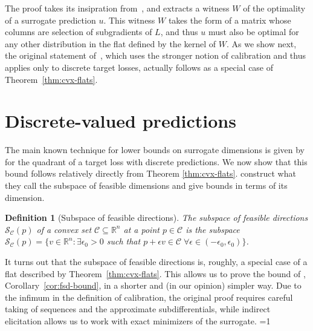 \documentclass{article}
\newcommand{\Comments}{1}
\newcommand{\mynote}[2]{\ifnum\Comments=1\textcolor{#1}{#2}\fi}
\newcommand{\mytodo}[2]{\ifnum\Comments=1%
	\todo[linecolor=#1!80!black,backgroundcolor=#1,bordercolor=#1!80!black]{#2}\fi}
\newcommand{\raft}[1]{\mytodo{green!20!white}{RF: #1}}
\newcommand{\jessiet}[1]{\mytodo{purple!20!white}{JF: #1}}
\newcommand{\bo}[1]{\mynote{blue}{[Bo: #1]}}
\newcommand{\reals}{\mathbb{R}}
\newcommand{\C}{\mathcal{C}}
\newcommand{\Sc}{\mathcal{S}}  %
\newtheorem{definition}{Definition}
\begin{document}
The proof takes its insipration from~\citet[Theorem 16]{ramaswamy2016convex}, and extracts a witness $W$ of the optimality of a surrogate prediction $u$.
This witness $W$ takes the form of a matrix whose columns are selection of subgradients of $L$, and thus $u$ must also be optimal for any other distribution in the flat defined by the kernel of $W$.
As we show next, the original statement of~\citet[Theorem 16]{ramaswamy2016convex}, which uses the stronger notion of calibration and thus applies only to discrete target losses, actually follows as a special case of Theorem~\ref{thm:cvx-flats}.

\section{Discrete-valued predictions}\label{sec:finite-calib}

The main known technique for lower bounds on surrogate dimensions is given by \citet{ramaswamy2016convex} for the quadrant of a target loss with discrete predictions.
We now show that this bound follows relatively directly from Theorem \ref{thm:cvx-flats}.
\citet{ramaswamy2016convex} construct what they call the subspace of feasible dimensions and give bounds in terms of its dimension.
\begin{definition}[Subspace of feasible directions]\label{def:subspace-feas}
	The \emph{subspace of feasible directions} $\Sc_\C(p)$ of a convex set $\C \subseteq \reals^n$ at a point $p \in \C$ is the subspace $\Sc_\C(p) = \{ v \in \reals^n : \exists \epsilon_0 > 0 $ such that $p + \epsilon v \in \C \; \forall \epsilon \in (-\epsilon_0,\epsilon_0) \}$.
\end{definition}

It turns out that the subspace of feasible directions is, roughly, a special case of a flat described by Theorem~\ref{thm:cvx-flats}.
This allows us to prove the bound of \citet{ramaswamy2016convex}, Corollary~\ref{cor:fsd-bound}, in a shorter and (in our opinion) simpler way.
Due to the infimum in the definition of calibration, the original proof requires careful taking of sequences and the approximate subdifferentials, while indirect elicitation allows us to work with exact minimizers of the surrogate.
\raft{Revisit this sentence!}
\end{document}

